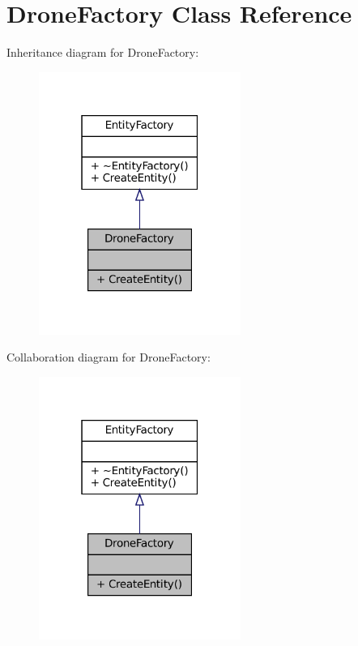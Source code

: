 \hypertarget{classDroneFactory}{}\section{Drone\+Factory Class Reference}
\label{classDroneFactory}


Inheritance diagram for Drone\+Factory\+:\nopagebreak
\begin{figure}[H]
\begin{center}
\leavevmode
\includegraphics[width=187pt]{classDroneFactory__inherit__graph}
\end{center}
\end{figure}


Collaboration diagram for Drone\+Factory\+:\nopagebreak
\begin{figure}[H]
\begin{center}
\leavevmode
\includegraphics[width=187pt]{classDroneFactory__coll__graph}
\end{center}
\end{figure}
